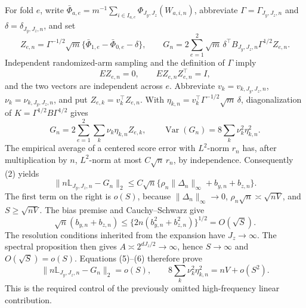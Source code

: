 For fold \(e\), write \(\bar\Phi_{a,e}=m^{-1}\sum_{i\in I_{a,e}}\Phi_{J_y,J_z}(W_{a,i,n})\), abbreviate \(\Gamma=\Gamma_{J_y,J_z,n}\) and \(\delta=\delta_{J_y,J_z,n}\), and set
\[
Z_{e,n}=\Gamma^{-1/2}\sqrt m\{\bar\Phi_{1,e}-\bar\Phi_{0,e}-\delta\},
\qquad
G_n=2\sum_{e=1}^2\sqrt m\,\delta^\top B_{J_y,J_z,n}\Gamma^{1/2}Z_{e,n}. \tag{3}
\]
Independent randomized-arm sampling and the definition of \(\Gamma\) imply
\[
E Z_{e,n}=0,\qquad E Z_{e,n}Z_{e,n}^\top=I,
\]
and the two vectors are independent across \(e\).  Abbreviate \(v_k=v_{k,J_y,J_z,n}\), \(\nu_k=\nu_{k,J_y,J_z,n}\), and put \(Z_{e,k}=v_k^\top Z_{e,n}\).  With \(\eta_{k,n}=v_k^\top\Gamma^{-1/2}\sqrt m\,\delta\), diagonalization of \(K=\Gamma^{1/2}B\Gamma^{1/2}\) gives
\[
G_n=2\sum_{e=1}^2\sum_k\nu_k\eta_{k,n}Z_{e,k},
\qquad
\operatorname{Var}(G_n)=8\sum_k\nu_k^2\eta_{k,n}^2. \tag{4}
\]
The empirical average of a centered score error with \(L^2\)-norm \(r_n\) has, after multiplication by \(n\), \(L^2\)-norm at most \(C\sqrt n\,r_n\), by independence.  Consequently (2) yields
\[
\|n\mathbb L_{J_y,J_z,n}-G_n\|_2
\le C\sqrt n\{\rho_n\|\Delta_n\|_\infty+b_{y,n}+b_{z,n}\}. \tag{5}
\]
The first term on the right is \(o(S)\), because \(\|\Delta_n\|_\infty\to0\), \(\rho_n\sqrt n\asymp\sqrt{nV}\), and \(S\ge\sqrt{nV}\).  The bias premise and Cauchy--Schwarz give
\[
\sqrt n(b_{y,n}+b_{z,n})
\le\{2n(b_{y,n}^2+b_{z,n}^2)\}^{1/2}=O(\sqrt S). \tag{6}
\]
The resolution conditions inherited from the expansion have \(J_z\to\infty\).  The spectral proposition then gives \(A\asymp2^{dJ_z/2}\to\infty\), hence \(S\to\infty\) and \(O(\sqrt S)=o(S)\).  Equations (5)--(6) therefore prove
\[
\|n\mathbb L_{J_y,J_z,n}-G_n\|_2=o(S),
\qquad
8\sum_k\nu_k^2\eta_{k,n}^2=nV+o(S^2). \tag{7}
\]
This is the required control of the previously omitted high-frequency linear contribution.


